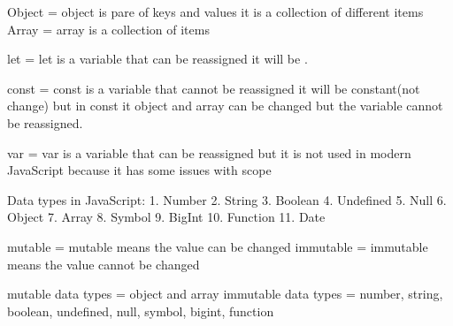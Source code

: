 Object = object is pare of keys and values it is a collection of different items
Array = array is a collection of items



let = let is a variable that can be reassigned it will be .



const = const is a variable that cannot be reassigned it will be constant(not change)
but in const it object and array can be changed but the variable cannot be reassigned.



var = var is a variable that can be reassigned but it is not used in modern JavaScript because it has some issues with scope




Data types in JavaScript:
1. Number
2. String
3. Boolean
4. Undefined
5. Null
6. Object
7. Array
8. Symbol
9. BigInt
10. Function
11. Date    


mutable = mutable means the value can be changed
immutable = immutable means the value cannot be changed

mutable data types = object and array
immutable data types = number, string, boolean, undefined, null, symbol, bigint, function